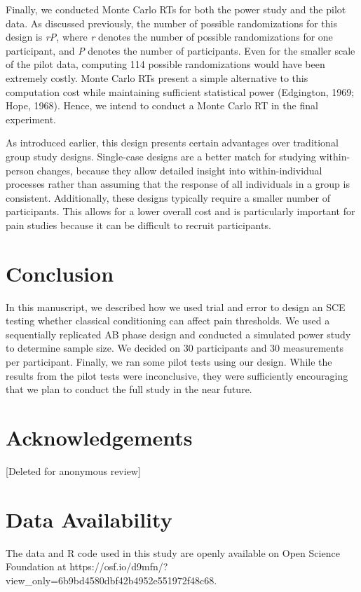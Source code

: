 \documentclass{article}
\begin{document}
Finally, we conducted Monte Carlo RTs for both the power study and the pilot data. As discussed previously, the number of possible randomizations for this design is \emph{r}\emph{P}, where \emph{r} denotes the number of possible randomizations for one participant, and \emph{P} denotes the number of participants. Even for the smaller scale of the pilot data, computing 114 possible randomizations would have been extremely costly. Monte Carlo RTs present a simple alternative to this computation cost while maintaining sufficient statistical power (Edgington, 1969; Hope, 1968). Hence, we intend to conduct a Monte Carlo RT in the final experiment.

As introduced earlier, this design presents certain advantages over traditional group study designs. Single-case designs are a better match for studying within-person changes, because they allow detailed insight into within-individual processes rather than assuming that the response of all individuals in a group is consistent. Additionally, these designs typically require a smaller number of participants. This allows for a lower overall cost and is particularly important for pain studies because it can be difficult to recruit participants.

\section{Conclusion}

In this manuscript, we described how we used trial and error to design an SCE testing whether classical conditioning can affect pain thresholds. We used a sequentially replicated AB phase design and conducted a simulated power study to determine sample size. We decided on 30 participants and 30 measurements per participant. Finally, we ran some pilot tests using our design. While the results from the pilot tests were inconclusive, they were sufficiently encouraging that we plan to conduct the full study in the near future.

\section{Acknowledgements}

[Deleted for anonymous review]

\section{Data Availability}

The data and R code used in this study are openly available on Open Science Foundation at https://osf.io/d9mfn/?view\_only=6b9bd4580dbf42b4952e551972f48c68.
\end{document}
